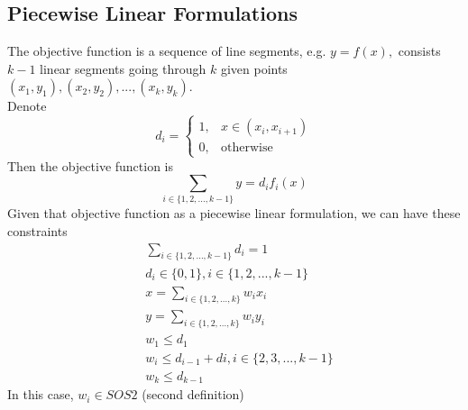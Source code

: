 			\subsection{Piecewise Linear Formulations}
				 The objective function is a sequence of line segments, e.g. $y=f(x), $ consists $k-1$ linear segments going through $k$ given points $(x_1, y_1), (x_2, y_2), ... ,(x_k, y_k)$.\\
				Denote 
				\begin{equation}d_i=\begin{cases}1, & x\in (x_i, x_{i+1})\\0, & \text{otherwise} \end{cases}\nonumber\end{equation}
				Then the objective function is
				\begin{equation}\sum_{i \in \{1, 2, ..., k-1\}} y = d_if_i(x)\nonumber \end{equation} 
				 Given that objective function as a piecewise linear formulation, we can have these constraints\\
				\begin{align}
					&\sum_{i \in \{1, 2, ..., k-1\}} d_i =1 \nonumber \\
					&d_i \in \{0, 1\}, i \in \{1, 2, ..., k-1\} \nonumber \\
					& x = \sum_{i \in \{1, 2, ..., k\}} w_i x_i \nonumber \\
					& y = \sum_{i \in \{1, 2, ..., k\}} w_i y_i \nonumber \\
					& w_1 \le d_1 \nonumber \\
					& w_i \le d_{i-1} + d{i}, i \in \{2, 3, ..., k-1\} \nonumber \\
					& w_k \le d_{k-1} \nonumber
				\end{align}
				In this case, $ w_i \in SOS2$ (second definition)		
									
